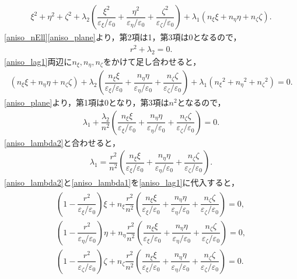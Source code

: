 \begin{align}
  \xi^2+\eta^2+\zeta^2+\lambda_2\left(\dfrac{\xi^2}{\varepsilon_\xi/\varepsilon_0}+\dfrac{\eta^2}{\varepsilon_\eta/\varepsilon_0}+\dfrac{\zeta^2}{\varepsilon_\zeta/\varepsilon_0}\right)+\lambda_1\left(n_\xi\xi+n_\eta\eta+n_\zeta\zeta\right) .
\end{align}
\eqref{aniso_nEll}\eqref{aniso_plane}より，第2項は1，第3項は0となるので，
\begin{align}
  r^2+\lambda_2=0 . \label{aniso_lambda2}
\end{align}
\eqref{aniso_lag1}両辺に$n_\xi,n_\eta,n_\zeta$をかけて足し合わせると，
\begin{align*}
  \left(n_\xi\xi+n_\eta\eta+n_\zeta\zeta\right) + \lambda_2\left(\dfrac{n_\xi\xi}{\varepsilon_\xi/\varepsilon_0}
  + \dfrac{n_\eta\eta}{\varepsilon_\eta/\varepsilon_0} + \dfrac{n_\zeta\zeta}{\varepsilon_\zeta/\varepsilon_0}\right)
  +\lambda_1\left({n_\xi}^2+{n_\eta}^2+{n_\zeta}^2\right) = 0 .
\end{align*}
\eqref{aniso_plane}より，第1項は0となり，第3項は$n^2$となるので，
\begin{align*}
  \lambda_1+\dfrac{\lambda_2}{n^2}\left(\dfrac{n_\xi\xi}{\varepsilon_\xi/\varepsilon_0}+\dfrac{n_\eta\eta}{\varepsilon_\eta/\varepsilon_0}+\dfrac{n_\zeta\zeta}{\varepsilon_\zeta/\varepsilon_0}\right)=0 .
\end{align*}
\eqref{aniso_lambda2}と合わせると，
\begin{align}
  \lambda_1=\dfrac{r^2}{n^2}\left(\dfrac{n_\xi\xi}{\varepsilon_\xi/\varepsilon_0}+\dfrac{n_\eta\eta}{\varepsilon_\eta/\varepsilon_0}+\dfrac{n_\zeta\zeta}{\varepsilon_\zeta/\varepsilon_0}\right) . \label{aniso_lambda1}
\end{align}
\eqref{aniso_lambda2}と\eqref{aniso_lambda1}を\eqref{aniso_lag1}に代入すると，
\begin{align}
  \begin{split}
    \left(1-\dfrac{r^2}{\varepsilon_\xi/\varepsilon_0}\right)\xi+n_\xi\dfrac{r^2}{n^2}\left(\dfrac{n_\xi\xi}{\varepsilon_\xi/\varepsilon_0}
    + \dfrac{n_\eta\eta}{\varepsilon_\eta/\varepsilon_0}+\dfrac{n_\zeta\zeta}{\varepsilon_\zeta/\varepsilon_0}\right)=0 , \\
    \left(1-\dfrac{r^2}{\varepsilon_\eta/\varepsilon_0}\right)\eta+n_\eta\dfrac{r^2}{n^2}\left(\dfrac{n_\xi\xi}{\varepsilon_\xi/\varepsilon_0}
    + \dfrac{n_\eta\eta}{\varepsilon_\eta/\varepsilon_0}+\dfrac{n_\zeta\zeta}{\varepsilon_\zeta/\varepsilon_0}\right)=0 , \\
    \left(1-\dfrac{r^2}{\varepsilon_\zeta/\varepsilon_0}\right)\zeta+n_\zeta\dfrac{r^2}{n^2}\left(\dfrac{n_\xi\xi}{\varepsilon_\xi/\varepsilon_0}
    + \dfrac{n_\eta\eta}{\varepsilon_\eta/\varepsilon_0}+\dfrac{n_\zeta\zeta}{\varepsilon_\zeta/\varepsilon_0}\right)=0 .
  \end{split}\label{aniso_r}
\end{align}
